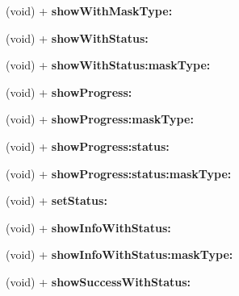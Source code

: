 \begin{DoxyCompactItemize}
(void) + {\bfseries show\+With\+Mask\+Type\+:}
\item 
\mbox{\label{interface_s_v_progress_h_u_d_a60c29bb6af2ff2d7734e57a5804f4958}} 
(void) + {\bfseries show\+With\+Status\+:}
\item 
\mbox{\label{interface_s_v_progress_h_u_d_a698e603ad6ce3cbfb647eaf171fe3401}} 
(void) + {\bfseries show\+With\+Status\+:mask\+Type\+:}
\item 
\mbox{\label{interface_s_v_progress_h_u_d_ac9563b162ed76b48df1762157d02c028}} 
(void) + {\bfseries show\+Progress\+:}
\item 
\mbox{\label{interface_s_v_progress_h_u_d_ab1d8666ead49c1c12c3db56a46946909}} 
(void) + {\bfseries show\+Progress\+:mask\+Type\+:}
\item 
\mbox{\label{interface_s_v_progress_h_u_d_a63e03edf6fa8dc21206be7f82fcb62b6}} 
(void) + {\bfseries show\+Progress\+:status\+:}
\item 
\mbox{\label{interface_s_v_progress_h_u_d_ae732a299150dc37ae469d33dcbeb13f3}} 
(void) + {\bfseries show\+Progress\+:status\+:mask\+Type\+:}
\item 
\mbox{\label{interface_s_v_progress_h_u_d_af8676af89efaaba13543aa9cb2b72a8a}} 
(void) + {\bfseries set\+Status\+:}
\item 
\mbox{\label{interface_s_v_progress_h_u_d_ad33521685958c52cab08b4ffeedb2a68}} 
(void) + {\bfseries show\+Info\+With\+Status\+:}
\item 
\mbox{\label{interface_s_v_progress_h_u_d_a97d5685d42e8bd9e6341e39e7f929348}} 
(void) + {\bfseries show\+Info\+With\+Status\+:mask\+Type\+:}
\item 
\mbox{\label{interface_s_v_progress_h_u_d_a869192f8fa7670e0e361cba5efbc4c9d}} 
(void) + {\bfseries show\+Success\+With\+Status\+:}
\item 

\end{DoxyCompactItemize}
